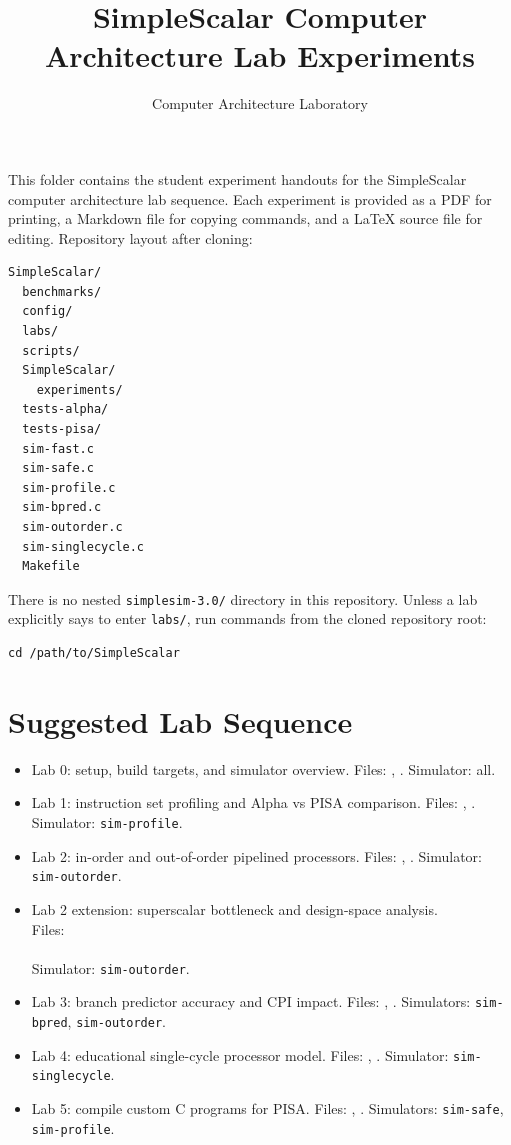 \documentclass[11pt]{article}
\title{SimpleScalar Computer Architecture Lab Experiments}
\author{Computer Architecture Laboratory}
\date{}
\begin{document}
\maketitle
This folder contains the student experiment handouts for the SimpleScalar computer architecture lab sequence. Each experiment is provided as a PDF for printing, a Markdown file for copying commands, and a LaTeX source file for editing.
Repository layout after cloning:
\begin{lstlisting}
SimpleScalar/
  benchmarks/
  config/
  labs/
  scripts/
  SimpleScalar/
    experiments/
  tests-alpha/
  tests-pisa/
  sim-fast.c
  sim-safe.c
  sim-profile.c
  sim-bpred.c
  sim-outorder.c
  sim-singlecycle.c
  Makefile
\end{lstlisting}
There is no nested \texttt{simplesim-3.0/} directory in this repository. Unless a lab explicitly says to enter \texttt{labs/}, run commands from the cloned repository root:
\begin{lstlisting}
cd /path/to/SimpleScalar
\end{lstlisting}
\section{Suggested Lab Sequence}
\begin{itemize}
\item Lab 0: setup, build targets, and simulator overview. Files: , . Simulator: all.
\item Lab 1: instruction set profiling and Alpha vs PISA comparison. Files: , . Simulator: \texttt{sim-profile}.
\item Lab 2: in-order and out-of-order pipelined processors. Files: , . Simulator: \texttt{sim-outorder}.
\item Lab 2 extension: superscalar bottleneck and design-space analysis.\\
Files: \\
\\
Simulator: \texttt{sim-outorder}.
\item Lab 3: branch predictor accuracy and CPI impact. Files: , . Simulators: \texttt{sim-bpred}, \texttt{sim-outorder}.
\item Lab 4: educational single-cycle processor model. Files: , . Simulator: \texttt{sim-singlecycle}.
\item Lab 5: compile custom C programs for PISA. Files: , . Simulators: \texttt{sim-safe}, \texttt{sim-profile}.
\end{itemize}
\end{document}
